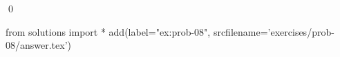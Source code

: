 
\begin{ex} 
  \label{ex:prob-08}
  
  \qed
\end{ex} 
\begin{python0}
from solutions import *
add(label="ex:prob-08",
    srcfilename='exercises/prob-08/answer.tex') 
\end{python0}
